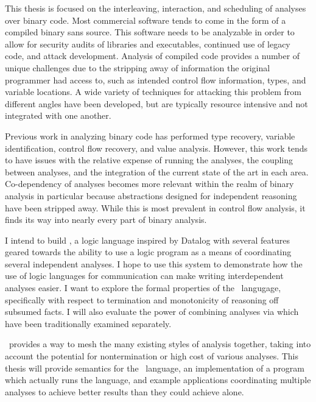 This thesis is focused on the interleaving, interaction, and scheduling of analyses over binary code.
Most commercial software tends to come in the form of a compiled binary sans source.
This software needs to be analyzable in order to allow for security audits of libraries and executables, continued use of legacy code, and attack development.
Analysis of compiled code provides a number of unique challenges due to the stripping away of information the original programmer had access to, such as intended control flow information, types, and variable locations.
A wide variety of techniques for attacking this problem from different angles have been developed, but are typically resource intensive and not integrated with one another.

Previous work in analyzing binary code has performed type recovery\cite{bitr}, variable identification\cite{divine}, control flow recovery\cite{jakstab,phoenix}, and value analysis\cite{vsa}.
However, this work tends to have issues with the relative expense of running the analyses, the coupling between analyses, and the integration of the current state of the art in each area.
Co-dependency of analyses becomes more relevant within the realm of binary analysis in particular because abstractions designed for independent reasoning have been stripped away.
While this is most prevalent in control flow analysis, it finds its way into nearly every part of binary analysis.

I intend to build \sysname, a logic language inspired by Datalog with several features geared towards the ability to use a logic program as a means of coordinating several independent analyses.
I hope to use this system to demonstrate how the use of logic languages for communication can make writing interdependent analyses easier.
I want to explore the formal properties of the \sysname\ langugage, specifically with respect to termination and monotonicity of reasoning off subsumed facts.
I will also evaluate the power of combining analyses via \sysname which have been traditionally examined separately.

\sysname\ provides a way to mesh the many existing styles of analysis together, taking into account the potential for nontermination or high cost of various analyses. This thesis will provide semantics for the \sysname\ language, an implementation of a program which actually runs the language, and example applications coordinating multiple analyses to achieve better results than they could achieve alone.
